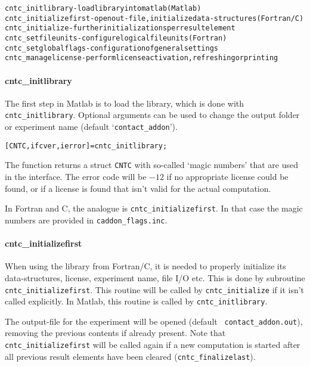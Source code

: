 \documentclass[12pt]{report}
\begin{document}
\begin{alltt}\small
cntc_initlibrary          - load library into matlab (Matlab)
cntc_initializefirst      - open out-file, initialize data-structures (Fortran/C)
cntc_initialize           - further initializations per result element
cntc_setfileunits         - configure logical file units (Fortran)
cntc_setglobalflags       - configuration of general settings
cntc_managelicense        - perform license activation, refreshing or printing
\end{alltt}

\paragraph{cntc\_initlibrary}

The first step in Matlab is to load the library, which is done with {\tt
cntc\_\-init\-library}. Optional arguments can be used to change the
output folder or experiment name (default `{\tt contact\_addon}').
\begin{alltt}\small
   [CNTC, ifcver, ierror] = cntc_initlibrary;
\end{alltt}
The function returns a struct {\tt CNTC} with so-called `magic numbers'
that are used in the interface. The error code will be $-12$ if no
appropriate license could be found, or if a license is found that isn't
valid for the actual computation.

In Fortran and C, the analogue is {\tt cntc\_initializefirst}. In that
case the magic numbers are provided in {\tt caddon\_\-flags.\-inc}.

\paragraph{cntc\_initializefirst}

When using the library from Fortran/C, it is needed to properly
initialize its data-structures, license, experiment name, file I/O etc.
This is done by subroutine {\tt cntc\_init\-ia\-lize\-first}. This
routine will be called by {\tt cntc\_initialize} if it isn't called
explicitly. In Matlab, this routine is called by {\tt cntc\_initlibrary}. 

The output-file for the experiment will be opened (default {\tt
contact\_addon.out}), removing the previous contents if already present.
Note that {\tt cntc\_initializefirst} will be called again if a new
computation is started after all previous result elements have been cleared
({\tt cntc\_finalizelast}).
\end{document}
